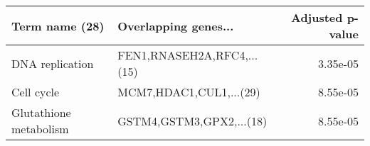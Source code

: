 \begin{tabular}{llr}
\toprule
        Term name (28) &       Overlapping genes... &  Adjusted p-value \\
\midrule
       DNA replication & FEN1,RNASEH2A,RFC4,...(15) &          3.35e-05 \\
            Cell cycle &    MCM7,HDAC1,CUL1,...(29) &          8.55e-05 \\
Glutathione metabolism &   GSTM4,GSTM3,GPX2,...(18) &          8.55e-05 \\
\bottomrule
\end{tabular}
